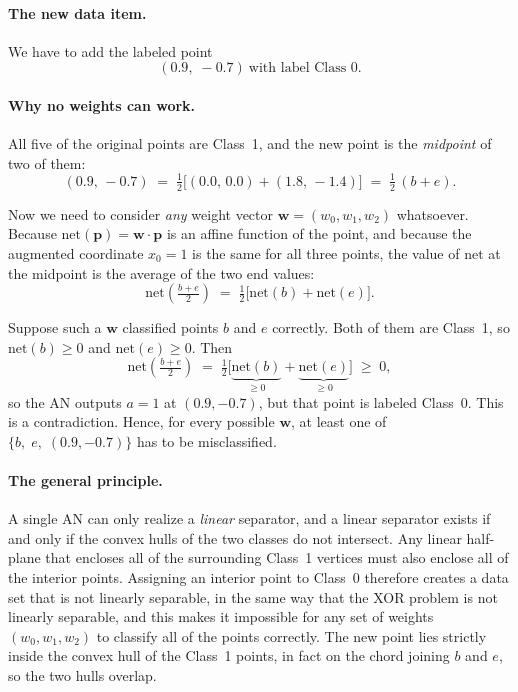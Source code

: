 \documentclass[11pt]{article}
\newcommand{\net}{\mathrm{net}}
\newcommand{\bw}{\mathbf{w}}
\newcommand{\bp}{\mathbf{p}}
\begin{document}
\paragraph{The new data item.} We have to add the labeled point
\[
\boxed{\;(0.9,\;-0.7)\ \text{with label Class } 0.\;}
\]

\paragraph{Why no weights can work.} All five of the original points are Class~1, and the
new point is the \emph{midpoint} of two of them:
\[
(0.9,\,-0.7) \;=\; \tfrac{1}{2}\big[(0.0,\,0.0) + (1.8,\,-1.4)\big] \;=\; \tfrac{1}{2}\,(b + e).
\]

Now we need to consider \emph{any} weight vector $\bw = (w_0,w_1,w_2)$ whatsoever. Because
$\net(\bp) = \bw\cdot\bp$ is an affine function of the point, and because the augmented
coordinate $x_0 = 1$ is the same for all three points, the value of $\net$ at the midpoint
is the average of the two end values:
\[
\net\!\left(\tfrac{b+e}{2}\right) \;=\; \tfrac{1}{2}\Big[\net(b) + \net(e)\Big].
\]

Suppose such a $\bw$ classified points $b$ and $e$ correctly. Both of them are Class~1, so
$\net(b) \ge 0$ and $\net(e) \ge 0$. Then
\[
\net\!\left(\tfrac{b+e}{2}\right) \;=\; \tfrac{1}{2}\big[\underbrace{\net(b)}_{\ge 0} + \underbrace{\net(e)}_{\ge 0}\big] \;\ge\; 0 ,
\]
so the AN outputs $a = 1$ at $(0.9,-0.7)$, but that point is labeled Class~0. This is a
contradiction. Hence, for every possible $\bw$, at least one of $\{b,\;e,\;(0.9,-0.7)\}$
has to be misclassified.

\paragraph{The general principle.} A single AN can only realize a \emph{linear} separator,
and a linear separator exists if and only if the convex hulls of the two classes do not
intersect. Any linear half-plane that encloses all of the surrounding Class~1 vertices must
also enclose all of the interior points. Assigning an interior point to Class~0 therefore
creates a data set that is not linearly separable, in the same way that the XOR problem is
not linearly separable, and this makes it impossible for any set of weights
$(w_0, w_1, w_2)$ to classify all of the points correctly. The new point lies strictly
inside the convex hull of the Class~1 points, in fact on the chord joining $b$ and $e$, so
the two hulls overlap.
\end{document}
